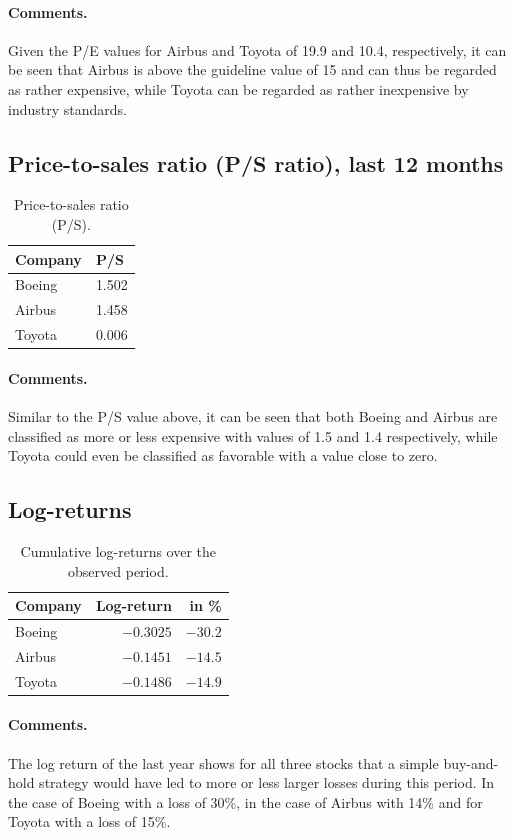 \paragraph{Comments.}
Given the P/E values for Airbus and Toyota of 19.9 and 10.4, respectively, it can be seen
that Airbus is above the guideline value of 15 and can thus be regarded as rather
expensive, while Toyota can be regarded as rather inexpensive by industry standards.

\subsection{Price-to-sales ratio (P/S ratio), last 12 months}

\begin{table}[H]
  \centering
  \caption{Price-to-sales ratio (P/S).}
  \label{tab:ps}
  \begin{tabular}{ll}
    \toprule
    Company & P/S\\
    \midrule
    Boeing & 1.502\\
    Airbus & 1.458\\
    Toyota & 0.006\\
    \bottomrule
  \end{tabular}
\end{table}

\paragraph{Comments.}
Similar to the P/S value above, it can be seen that both Boeing and Airbus are classified
as more or less expensive with values of 1.5 and 1.4 respectively, while Toyota could
even be classified as favorable with a value close to zero.

\subsection{Log-returns}

\begin{table}[H]
  \centering
  \caption{Cumulative log-returns over the observed period.}
  \label{tab:logret}
  \begin{tabular}{lrr}
    \toprule
    Company & Log-return & in \%\\
    \midrule
    Boeing & $-0.3025$ & $-30.2$\\
    Airbus & $-0.1451$ & $-14.5$\\
    Toyota & $-0.1486$ & $-14.9$\\
    \bottomrule
  \end{tabular}
\end{table}

\paragraph{Comments.}
The log return of the last year shows for all three stocks that a simple buy-and-hold
strategy would have led to more or less larger losses during this period. In the case of
Boeing with a loss of 30\%, in the case of Airbus with 14\% and for Toyota with a loss of
15\%.
